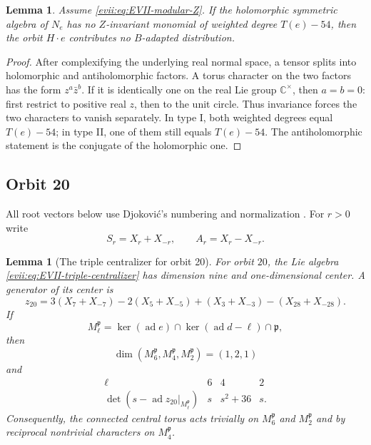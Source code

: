 \documentclass[11pt,reqno]{amsart}
\numberwithin{equation}{section}
\newtheorem{lemma}[theorem]{Lemma}
\theoremstyle{definition}
\theoremstyle{remark}
\newcommand{\C}{\mathbb C}
\newcommand{\ad}{\operatorname{ad}}
\newcommand{\fp}{\mathfrak p}
\begin{document}
\begin{lemma}\label{evii:lem:EVII-holomorphic-test}
Assume \eqref{evii:eq:EVII-modular-Z}.  If the holomorphic symmetric algebra of
$N_e$ has no $Z$-invariant monomial of weighted degree $T(e)-54$, then the
orbit $H\cdot e$ contributes no $B$-adapted distribution.
\end{lemma}

\begin{proof}
After complexifying the underlying real normal space, a tensor splits into
holomorphic and antiholomorphic factors.  A torus character on the two factors
has the form $z^a\bar z^b$.  If it is identically one on the real Lie group
$\C^\times$, then $a=b=0$: first restrict to positive real $z$, then to the
unit circle.  Thus invariance forces the two characters to vanish separately.
In type I, both weighted degrees equal $T(e)-54$; in type II, one of them still
equals $T(e)-54$.  The antiholomorphic statement is the conjugate of the
holomorphic one.
\end{proof}

\subsection{Orbit 20}

All root vectors below use Djokovi\'c's numbering and normalization
\cite[Tables~1 and~3 and Appendix]{Djokovic}.  For $r>0$ write
\begin{equation}\label{evii:eq:SA-notation}
 S_r=X_r+X_{-r},\qquad A_r=X_r-X_{-r}.
\end{equation}

\begin{lemma}[The triple centralizer for orbit 20]\label{evii:lem:EVII-orbit20-centralizer}
For orbit $20$, the Lie algebra \eqref{evii:eq:EVII-triple-centralizer} has dimension
nine and one-dimensional center.  A generator of its center is
\begin{equation}\label{evii:eq:EVII-z20}
 z_{20}=3(X_7+X_{-7})-2(X_5+X_{-5})
 +(X_3+X_{-3})-(X_{28}+X_{-28}).
\end{equation}
If
\[
 M_\ell^{\fp}=\ker(\ad e)\cap\ker(\ad d-\ell)\cap\fp,
\]
then
\[
 \dim(M_6^{\fp},M_4^{\fp},M_2^{\fp})=(1,2,1)
\]
and
\begin{equation}\label{evii:eq:EVII-z20-char}
\begin{array}{c|ccc}
\ell&6&4&2\\ \hline
\det(s-\ad z_{20}|_{M_\ell^{\fp}})&s&s^2+36&s.
\end{array}
\end{equation}
Consequently, the connected central torus acts trivially on
$M_6^{\fp}$ and $M_2^{\fp}$ and by reciprocal nontrivial characters on
$M_4^{\fp}$.
\end{lemma}
\end{document}
